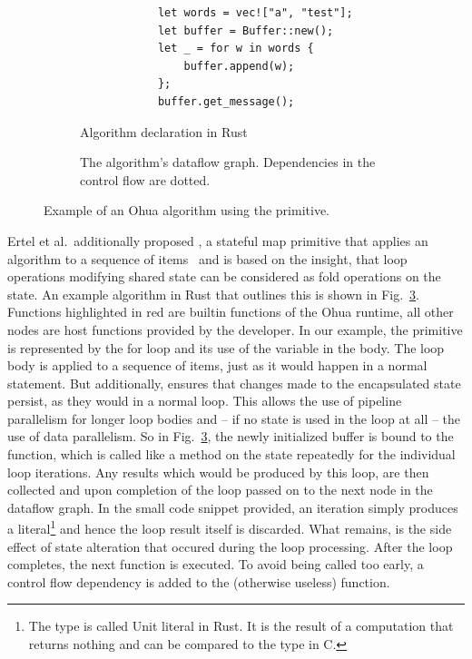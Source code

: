 \begin{figure}[h]
    \begin{subfigure}[h]{.5\textwidth}
        \begin{verbatim}
            let words = vec!["a", "test"];
            let buffer = Buffer::new();
            let _ = for w in words {
                buffer.append(w);
            };
            buffer.get_message();
        \end{verbatim}
        \caption{Algorithm declaration in Rust}
        \label{fig:backend:smap:algo}
    \end{subfigure}
    \begin{subfigure}[h]{.5\textwidth}
        \caption{The algorithm's dataflow graph. Dependencies in the control flow are dotted.}
        \label{fig:backend:smap:dfg}
    \end{subfigure}
    \caption{Example of an Ohua algorithm using the  primitive.}%
    \label{fig:background:smap}
\end{figure}

Ertel et al.\ additionally proposed , a stateful map primitive that applies an algorithm to a sequence of items~\cite{ertel2019stclang} and is based on the insight, that loop operations modifying shared state can be considered as fold operations on the state.
An example algorithm in Rust that outlines this is shown in Fig.~\ref{fig:background:smap}.
Functions highlighted in red are builtin functions of the Ohua runtime, all other nodes are host functions provided by the developer.
In our example, the  primitive is represented by the for loop and its use of the  variable in the body.
The loop body is applied to a sequence of items, just as it would happen in a normal  statement.
But additionally,  ensures that changes made to the encapsulated state persist, as they would in a normal  loop.
This allows the use of pipeline parallelism for longer loop bodies and -- if no state is used in the loop at all -- the use of data parallelism.
So in Fig.~\ref{fig:background:smap}, the newly initialized buffer is bound to the  function, which is called like a method on the state repeatedly for the individual loop iterations.
Any results which would be produced by this loop, are then collected and upon completion of the loop passed on to the next node in the dataflow graph.
In the small code snippet provided, an iteration simply produces a \rust{()} literal\footnote{The \rust{()} type is called Unit literal in Rust. It is the result of a computation that returns nothing and can be compared to the  type in C.} and hence the loop result itself is discarded.
What remains, is the side effect of state alteration that occured during the loop processing.
After the loop completes, the next function is executed.
To avoid  being called too early, a control flow dependency is added to the (otherwise useless)  function.

